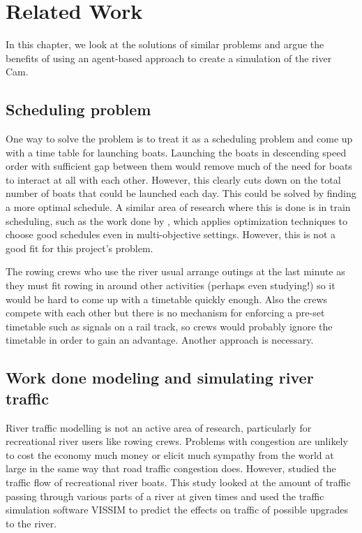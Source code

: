 \chapter{Related Work}\label{chapter:background}
  In this chapter, we look at the solutions of similar problems and argue the benefits of using an agent-based approach to create a simulation of the river Cam.

  \section{Scheduling problem}
    One way to solve the problem is to treat it as a scheduling problem and come up with a time table for launching boats. Launching the boats in descending speed order with sufficient gap between them would remove much of the need for boats to interact at all with each other. However, this clearly cuts down on the total number of boats that could be launched each day. This could be solved by finding a more optimal schedule. A similar area of research where this is done is in train scheduling, such as the work done by \textcite{Ghoseiri2004}, which applies optimization techniques to choose good schedules even in multi-objective settings. However, this is not a good fit for this project's problem. 
    
    The rowing crews who use the river usual arrange outings at the last minute as they must fit rowing in around other activities (perhaps even studying!) so it would be hard to come up with a timetable quickly enough. Also the crews compete with each other but there is no mechanism for enforcing a pre-set timetable such as signals on a rail track, so crews would probably ignore the timetable in order to gain an advantage. Another approach is necessary.

  \section{Work done modeling and simulating river traffic}
  River traffic modelling is not an active area of research, particularly for recreational river users like rowing crews. Problems with congestion are unlikely to cost the economy much money or elicit much sympathy from the world at large in the same way that road traffic congestion does. However, \textcite{Lowry2011} studied the traffic flow of recreational river boats. This study looked at the amount of traffic passing through various parts of a river at given times and used the traffic simulation software VISSIM to predict the effects on traffic of possible upgrades to the river. 
  
